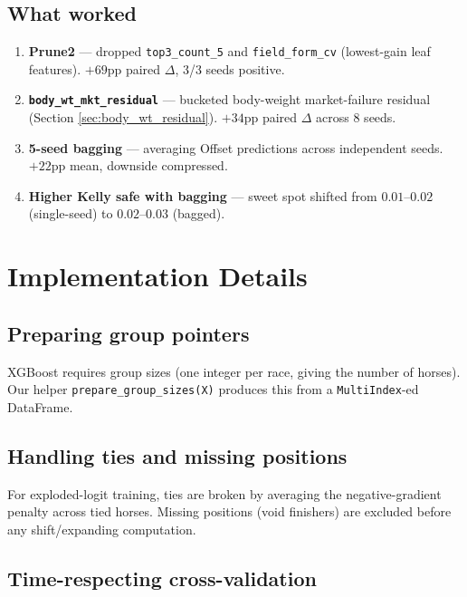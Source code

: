 \documentclass[11pt]{article}
\begin{document}
\subsection{What worked}

\begin{enumerate}\item \textbf{Prune2} --- dropped \texttt{top3\_count\_5} and
      \texttt{field\_form\_cv} (lowest-gain leaf features).
      $+69$pp paired $\Delta$, 3/3 seeds positive.
\item \textbf{\texttt{body\_wt\_mkt\_residual}} --- bucketed body-weight
      market-failure residual (Section \ref{sec:body_wt_residual}).
      $+34$pp paired $\Delta$ across 8 seeds.
\item \textbf{5-seed bagging} --- averaging Offset predictions across
      independent seeds. $+22$pp mean, downside compressed.
\item \textbf{Higher Kelly safe with bagging} --- sweet spot shifted
      from $0.01$--$0.02$ (single-seed) to $0.02$--$0.03$ (bagged).
\end{enumerate}

\section{Implementation Details}

\subsection{Preparing group pointers}

XGBoost requires group sizes (one integer per race, giving the number
of horses). Our helper \texttt{prepare\_group\_sizes(X)} produces this
from a \texttt{MultiIndex}-ed DataFrame.

\subsection{Handling ties and missing positions}

For exploded-logit training, ties are broken by averaging the
negative-gradient penalty across tied horses. Missing positions (void
finishers) are excluded before any shift/expanding computation.

\subsection{Time-respecting cross-validation}
\end{document}

